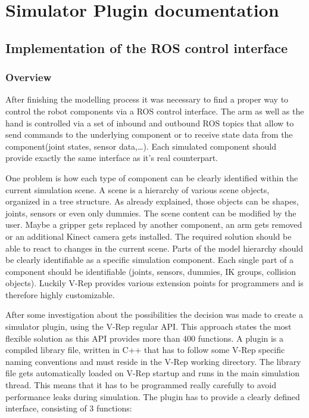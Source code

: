 
\chapter{Simulator Plugin documentation}

\section{Implementation of the ROS control interface}

\subsection{Overview}

After finishing the modelling process it was necessary to find a proper way to control the robot components via a ROS control interface. The arm as well as the hand is controlled via a set of inbound and outbound ROS topics that allow to send commands to the underlying component or to receive state data from the component(joint states, sensor data,\ldots). Each simulated component should provide exactly the same interface as it's real counterpart.

One problem is how each type of component can be clearly identified within the current simulation scene. A scene is a hierarchy of various scene objects, organized in a tree structure. As already explained, those objects can be shapes, joints, sensors or even only dummies. The scene content can be modified by the user. Maybe a gripper gets replaced by another component, an arm gets removed or an additional Kinect camera gets installed. The required solution should be able to react to changes in the current scene. Parts of the model hierarchy should be clearly identifiable as a specific simulation component. Each single part of a component should be identifiable (joints, sensors, dummies, IK groups, collision objects). Luckily V-Rep provides various extension points for programmers and is therefore highly customizable. 

After some investigation about the possibilities the decision was made to create a simulator plugin, using the V-Rep regular API. This approach states the most flexible solution as this API provides more than 400 functions. A plugin is a compiled library file, written in C++ that has to follow some V-Rep specific naming conventions and must reside in the V-Rep working directory. The library file gets automatically loaded on V-Rep startup and runs in the main simulation thread. This means that it has to be programmed really carefully to avoid performance leaks during simulation. The plugin has to provide a clearly defined interface, consisting of 3 functions:

